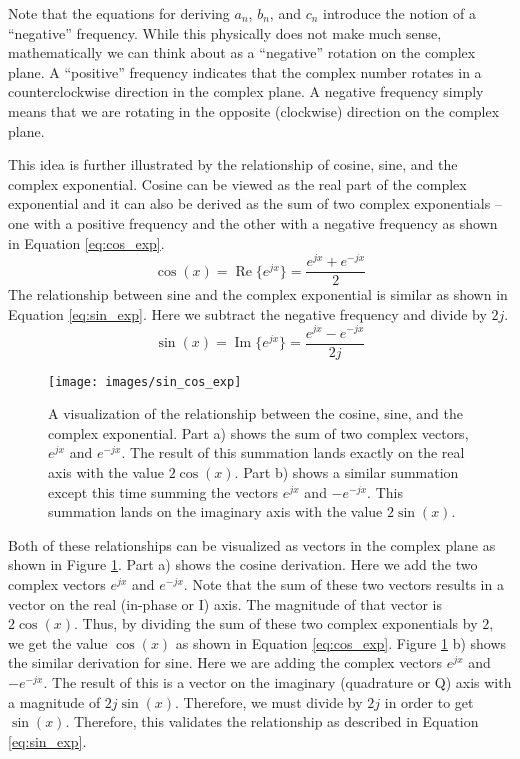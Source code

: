 Note that the equations for deriving $a_n$, $b_n$, and $c_n$ introduce the notion of a ``negative'' frequency. While this physically does not make much sense, mathematically we can think about as a ``negative'' rotation on the complex plane. A ``positive'' frequency indicates that the complex number rotates in a counterclockwise direction in the complex plane. A negative frequency simply means that we are rotating in the opposite (clockwise) direction on the complex plane. 



This idea is further illustrated by the relationship of cosine, sine, and the complex exponential.  Cosine can be viewed as the real part of the complex exponential and it can also be derived as the sum of two complex exponentials -- one with a positive frequency and the other with a negative frequency as shown in Equation \ref{eq:cos_exp}.
\begin{equation}
\cos(x) = \operatorname{Re} \{ e^{jx} \} = \frac{e^{jx} + e^{-jx}}{2}
\label{eq:cos_exp}
\end{equation} 
The relationship between sine and the complex exponential is similar as shown in Equation \ref{eq:sin_exp}. Here we subtract the negative frequency and divide by $2j$.
\begin{equation}
\sin(x) = \operatorname{Im} \{ e^{jx} \} = \frac{e^{jx} - e^{-jx}}{2j} 
\label{eq:sin_exp}
\end{equation}

\begin{figure}
\centering
\texttt{[image: images/sin\_cos\_exp]}
\caption{A visualization of the relationship between the cosine, sine, and the complex exponential. Part a) shows the sum of two complex vectors, $e^{jx}$ and $e^{-jx}$. The result of this summation lands exactly on the real axis with the value $2 \cos (x)$. Part b) shows a similar summation except this time summing the vectors $e^{jx}$ and $-e^{-jx}$. This summation lands on the imaginary axis with the value $2 \sin (x)$.}
\label{fig:sin_cos_exp}
\end{figure}


Both of these relationships can be visualized as vectors in the complex plane as shown in Figure \ref{fig:sin_cos_exp}. Part a) shows the cosine derivation. Here we add the two complex vectors $e^{jx}$ and $e^{-jx}$. Note that the sum of these two vectors results in a vector on the real (in-phase or I) axis. The magnitude of that vector is $2 \cos(x)$. Thus, by dividing the sum of these two complex exponentials by $2$, we get the value $\cos (x)$ as shown in Equation \ref{eq:cos_exp}.  Figure \ref{fig:sin_cos_exp} b) shows the similar derivation for sine. Here we are adding the complex vectors $e^{jx}$ and $-e^{-jx}$. The result of this is a vector on the imaginary (quadrature or Q) axis with a magnitude of $2j \sin (x)$. Therefore, we must divide by $2j$ in order to get $\sin (x)$. Therefore, this validates the relationship as described in Equation \ref{eq:sin_exp}.


